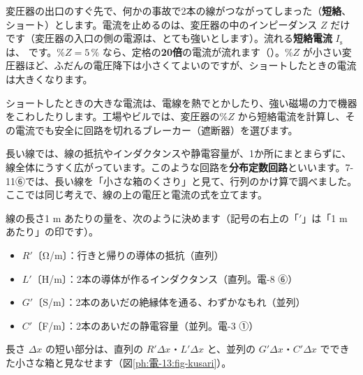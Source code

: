 変圧器の出口のすぐ先で、何かの事故で2本の線がつながってしまった（\textbf{短絡}、ショート）とします。電流を止めるのは、変圧器の中のインピーダンス $Z$ だけです（変圧器の入口の側の電源は、とても強いとします）。流れる\textbf{短絡電流} $I_{\mathrm s}$ は、
\label{ph:電-13:tanraku}です。\%$Z=5\,\%$ なら、定格の\textbf{20倍}の電流が流れます（）。\%$Z$ が小さい変圧器ほど、ふだんの電圧降下は小さくてよいのですが、ショートしたときの電流は大きくなります。

\begin{phmijika}[ブレーカーの選び方]
ショートしたときの大きな電流は、電線を熱でとかしたり、強い磁場の力で機器をこわしたりします。工場やビルでは、変圧器の\%$Z$ から短絡電流を計算し、その電流でも安全に回路を切れるブレーカー（遮断器）を選びます。
\end{phmijika}

\phkokomade


\label{ph:電-13:sec6}
長い線では、線の抵抗やインダクタンスや静電容量が、1か所にまとまらずに、線全体にうすく広がっています。このような回路を\textbf{分布定数回路}といいます。7-11⑥では、長い線を「小さな箱のくさり」と見て、行列のかけ算で調べました。ここでは同じ考えで、線の上の電圧と電流の式を立てます。

線の長さ1 m あたりの量を、次のように決めます（記号の右上の「$'$」は「1 m あたり」の印です）。
\begin{itemize}[leftmargin=1.2\zw, itemsep=1pt, topsep=1pt, label={\color{bkTheme}●}]
\item $R'$〔Ω/m〕：行きと帰りの導体の抵抗（直列）
\item $L'$〔H/m〕：2本の導体が作るインダクタンス（直列。電-8 ⑥）
\item $G'$〔S/m〕：2本のあいだの絶縁体を通る、わずかなもれ（並列）
\item $C'$〔F/m〕：2本のあいだの静電容量（並列。電-3 ①）
\end{itemize}
長さ $\Delta x$ の短い部分は、直列の $R'\Delta x$・$L'\Delta x$ と、並列の $G'\Delta x$・$C'\Delta x$ でできた小さな箱と見なせます（図\ref{ph:電-13:fig-kusari}）。

